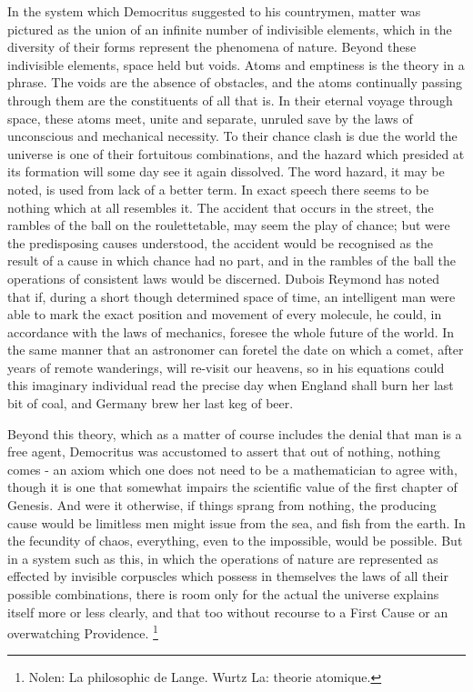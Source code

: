 \documentclass[]{book}
\let\rmarkdownfootnote\footnote%
\def\footnote{\protect\rmarkdownfootnote}
\begin{document}
In the system which Democritus suggested to his countrymen, matter was
pictured as the union of an infinite number of indivisible elements,
which in the diversity of their forms represent the phenomena of nature.
Beyond these indivisible elements, space held but voids. Atoms and
emptiness is the theory in a phrase. The voids are the absence of
obstacles, and the atoms continually passing through them are the
constituents of all that is. In their eternal voyage through space,
these atoms meet, unite and separate, unruled save by the laws of
unconscious and mechanical necessity. To their chance clash is due the
world the universe is one of their fortuitous combinations, and the
hazard which presided at its formation will some day see it again
dissolved. The word hazard, it may be noted, is used from lack of a
better term. In exact speech there seems to be nothing which at all
resembles it. The accident that occurs in the street, the rambles of the
ball on the roulettetable, may seem the play of chance; but were the
predisposing causes understood, the accident would be recognised as the
result of a cause in which chance had no part, and in the rambles of the
ball the operations of consistent laws would be discerned. Dubois
Reymond has noted that if, during a short though determined space of
time, an intelligent man were able to mark the exact position and
movement of every molecule, he could, in accordance with the laws of
mechanics, foresee the whole future of the world. In the same manner
that an astronomer can foretel the date on which a comet, after years of
remote wanderings, will re-visit our heavens, so in his equations could
this imaginary individual read the precise day when England shall burn
her last bit of coal, and Germany brew her last keg of beer.

Beyond this theory, which as a matter of course includes the denial that
man is a free agent, Democritus was accustomed to assert that out of
nothing, nothing comes - an axiom which one does not need to be a
mathematician to agree with, though it is one that somewhat impairs the
scientific value of the first chapter of Genesis. And were it otherwise,
if things sprang from nothing, the producing cause would be limitless
men might issue from the sea, and fish from the earth. In the fecundity
of chaos, everything, even to the impossible, would be possible. But in
a system such as this, in which the operations of nature are represented
as effected by invisible corpuscles which possess in themselves the laws
of all their possible combinations, there is room only for the actual
the universe explains itself more or less clearly, and that too without
recourse to a First Cause or an overwatching Providence. \footnote{Nolen:
  La philosophic de Lange. Wurtz La: theorie atomique.}
\end{document}
